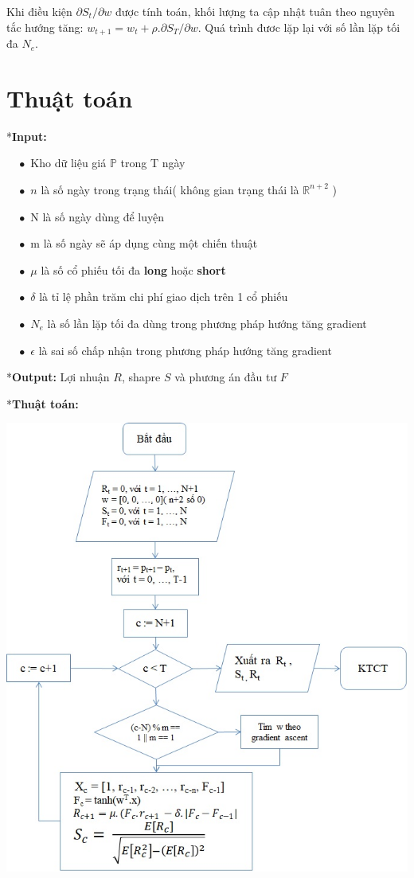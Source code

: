 \documentclass[14pt]{extreport}
\begin{document}
Khi điều kiện $\partial S_t/\partial w$ được tính toán, khối lượng ta cập nhật tuân theo nguyên tắc hướng tăng: $w_{t+1}=w_t+\rho.\partial S_T/\partial w$. Quá trình đươc lặp lại với số lần lặp tối đa $N_e$.

\section{Thuật toán}

*\textbf{Input: }

$\quad \bullet$ Kho dữ liệu giá $\mathbb{P}$ trong T ngày

$\quad \bullet $ $n$ là số ngày trong trạng thái( không gian trạng thái là $\mathbb{R}^{n+2}$ )

$\quad \bullet $ N là số ngày dùng để luyện

$\quad \bullet $ m là số ngày sẽ áp dụng cùng một chiến thuật

$\quad \bullet $ {\large $\mu$} là số cổ phiếu tối đa \textbf{long} hoặc \textbf{short} 

$\quad \bullet $ {\large $\delta$} là tỉ lệ phần trăm chi phí giao dịch trên 1 cổ phiếu 

$\quad \bullet $ $N_e$ là số lần lặp tối đa dùng trong phương pháp hướng tăng gradient

$\quad \bullet $ {\large $\epsilon$} là sai số chấp nhận trong phương pháp hướng tăng gradient


*\textbf{Output: } Lợi nhuận $\mathit{R}$, shapre $\mathit{S}$ và phương án đầu tư $\mathit{F}$ 

*\textbf{Thuật toán: }

\begin{center}
\includegraphics[scale=0.9]{Thuat_toan.jpg}
\end{center}
\end{document}
